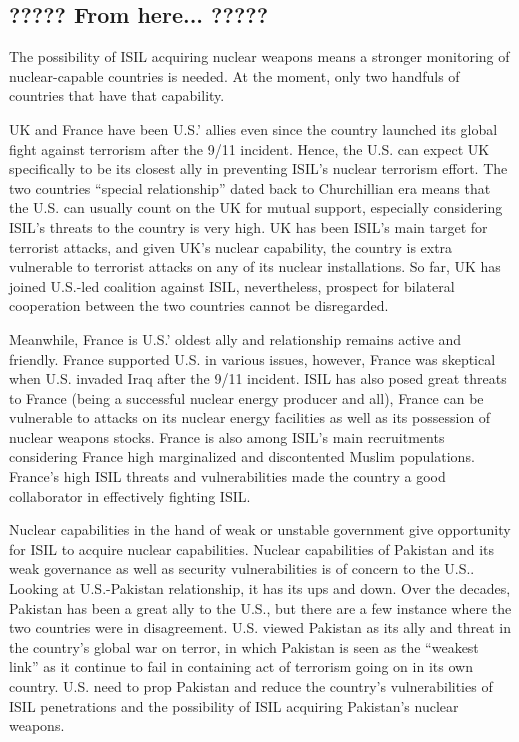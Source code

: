 \documentclass{report}
\begin{document}
\subsection{????? From here... ?????}
The possibility of ISIL acquiring nuclear weapons means a stronger monitoring of nuclear-capable countries is needed. At the moment, only two handfuls of countries that have that capability. 

UK and France have been U.S.' allies even since the country launched its global fight against terrorism after the 9/11 incident. Hence, the U.S. can expect UK specifically to be its closest ally in preventing ISIL's nuclear terrorism effort. The two countries \enquote{special relationship} dated back to Churchillian era means that the U.S. can usually count on the UK for mutual support, especially considering ISIL's threats to the country is very high. UK has been ISIL's main target for terrorist attacks, and given UK's nuclear capability, the country is extra vulnerable to terrorist attacks on any of its nuclear installations. So far, UK has joined U.S.-led coalition against ISIL, nevertheless, prospect for bilateral cooperation between the two countries cannot be disregarded.

Meanwhile, France is U.S.' oldest ally and relationship remains active and friendly. France supported U.S. in various issues, however, France was skeptical when U.S. invaded Iraq after the 9/11 incident. ISIL has also posed great threats to France (being a successful nuclear energy producer and all), France can be vulnerable to attacks on its nuclear energy facilities as well as its possession of nuclear weapons stocks. France is also among ISIL's main recruitments considering France high marginalized and discontented Muslim populations. France's high ISIL threats and vulnerabilities made the country a good collaborator in effectively fighting ISIL.

Nuclear capabilities in the hand of weak or unstable government give opportunity for ISIL to acquire nuclear capabilities. Nuclear capabilities of Pakistan and its weak governance as well as security vulnerabilities is of concern to the U.S.. Looking at U.S.-Pakistan relationship, it has its ups and down. Over the decades, Pakistan has been a great ally to the U.S., but there are a few instance where the two countries were in disagreement. U.S. viewed Pakistan as its ally and threat in the country's global war on terror, in which Pakistan is seen as the \enquote{weakest link} as it continue to fail in containing act of terrorism going on in its own country. U.S. need to prop Pakistan and reduce the country's vulnerabilities of ISIL penetrations and the possibility of ISIL acquiring Pakistan's nuclear weapons.
\end{document}

